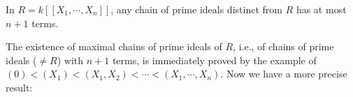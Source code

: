 In $R = k[[X_1, \cdots, X_n]]$, any chain of prime ideals distinct from $R$ has at most $n+1$ terms.

The existence of maximal chains of prime ideals of $R$, i.e., of chains of prime ideals ($\neq R$) with $n+1$ terms, is immediately proved by the example of $(0) < (X_1) < (X_1, X_2) < \cdots < (X_1, \cdots, X_n)$. Now we have a more precise result: